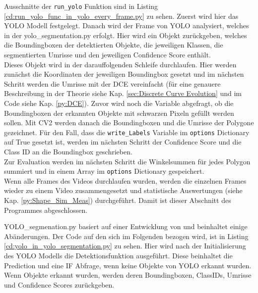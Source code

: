 {	Ausschnitte der \lstinline|run_yolo| Funktion sind in Listing \ref{cd:run_yolo_func_in_yolo_every_frame.py} zu sehen. Zuerst wird hier das YOLO Modell festgelegt. Danach wird der Frame von YOLO analysiert, welches in der yolo\_segmentation.py erfolgt. Hier wird ein Objekt zurückgeben, welches die Boundingboxen der detektierten Objekte, die jeweiligen Klassen, die segmentierten Umrisse und den jeweiligen Confidence Score enthält. \\
	Dieses Objekt wird in der darauffolgenden Schleife durchlaufen. Hier werden zunächst die Koordinaten der jeweiligen Boundingbox gesetzt und im nächsten Schritt werden die Umrisse mit der DCE vereinfacht (für eine genauere Beschreibung in der Theorie siehe Kap. \ref{sec:Discrete Curve Evolution} und im Code siehe Kap. \ref{py:DCE}). 
	Zuvor wird noch die Variable abgefragt, ob die Boundingboxen der erkannten Objekte mit schwarzen Pixeln gefüllt werden sollen. Mit CV2 werden danach die Boundingboxen und die Umrisse der Polygone gezeichnet. Für den Fall, dass die \lstinline|write_Labels| Variable im \lstinline|options| Dictionary auf True gesetzt ist, werden im nächsten Schritt der Confidence Score und die Class ID an die Boundingbox geschrieben. \\
	Zur Evaluation werden im nächsten Schritt die Winkelsummen für jedes Polygon summiert und in einem Array im \lstinline|options| Dictionary gespeichert. \\
	Wenn alle Frames des Videos durchlaufen wurden, werden die einzelnen Frames wieder zu einem Video zusammengesetzt und statistische Auswertungen (siehe Kap. \ref{py:Shape_Sim_Meas}) durchgeführt. Damit ist dieser Abschnitt des Programmes abgeschlossen.

	

	YOLO\_segmenation.py basiert auf einer Entwicklung von \citeauthor{Canu_pysource} \citep{Canu_pysource} und beinhaltet einige Abänderungen. Der Code auf den sich im Folgenden bezogen wird, ist in Listing \ref{cd:yolo_in_yolo_segmentation.py} zu sehen. Hier wird nach der Initialisierung des YOLO Modells die Detektionsfunktion ausgeführt. Diese beinhaltet die Prediction und eine IF Abfrage, wenn keine Objekte von YOLO erkannt wurden. Wenn Objekte erkannt wurden, werden deren Boundingboxen, ClassIDs, Umrisse und Confidence Scores zurückgeben. 
	}

